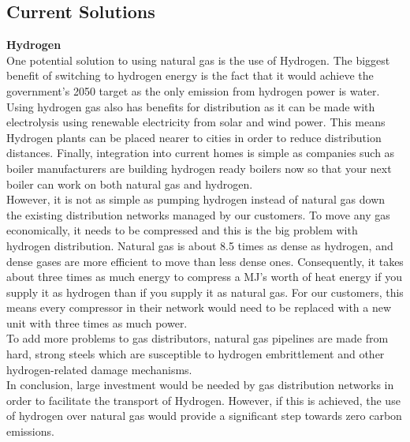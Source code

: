 \documentclass[11pt]{article}		%
\begin{document}
            \subsection[Current Solutions]{Current Solutions}
            \textbf{Hydrogen} \\
            One potential solution to using natural gas is the use of Hydrogen. The biggest benefit of switching to hydrogen energy is the fact that it would achieve the government's 2050 target as the only emission from hydrogen power is water. Using hydrogen gas also has benefits for distribution as it can be made with electrolysis using renewable electricity from solar and wind power. This means Hydrogen plants can be placed nearer to cities in order to reduce distribution distances. Finally, integration into current homes is simple as companies such as boiler manufacturers are building hydrogen ready boilers now so that your next boiler can work on both natural gas and hydrogen.\\
            \hspace*{3ex}However, it is not as simple as pumping hydrogen instead of natural gas down the existing distribution networks managed by our customers. To move any gas economically, it needs to be compressed and this is the big problem with hydrogen distribution. Natural gas is about 8.5 times as dense as hydrogen, and dense gases are more efficient to move than less dense ones. Consequently, it takes about three times as much energy to compress a MJ’s worth of heat energy if you supply it as hydrogen than if you supply it as natural gas. For our customers, this means every compressor in their network would need to be replaced with a new unit with three times as much power.\\
            \hspace*{3ex}To add more problems to gas distributors, natural gas pipelines are made from hard, strong steels which are susceptible to hydrogen embrittlement and other hydrogen-related damage mechanisms.\\
            \hspace*{3ex}In conclusion, large investment would be needed by gas distribution networks in order to facilitate the transport of Hydrogen. However, if this is achieved, the use of hydrogen over natural gas would provide a significant step towards zero carbon emissions.\\ 
            
\end{document}
